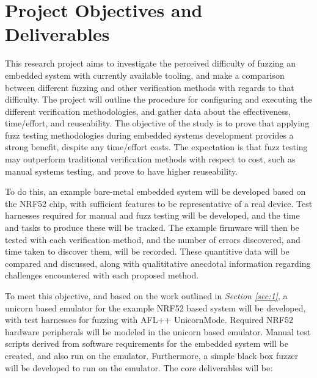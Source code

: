 \documentclass[11pt]{article}
\begin{document}
\section{Project Objectives and Deliverables} \label{sec:2}
This research project aims to investigate the perceived difficulty of fuzzing
an embedded system with currently available tooling, and make a comparison
between different fuzzing and other verification methods with regards to that
difficulty. The project will outline the procedure for configuring and
executing the different verification methodologies, and gather data about the
effectiveness, time/effort, and reuseability. The objective of the study is to
prove that applying fuzz testing methodologies during embedded systems
development provides a strong benefit, despite any time/effort costs. The
expectation is that fuzz testing may outperform traditional verification
methods with respect to cost, such as manual systems testing, and prove to have
higher reuseability.

To do this, an example bare-metal embedded system will be developed based on
the NRF52 chip, with sufficient features to be representative of a real device.
Test harnesses required for manual and fuzz testing will be developed, and the
time and tasks to produce these will be tracked. The example firmware will then
be tested with each verification method, and the number of errors discovered,
and time taken to discover them, will be recorded. These quantitive data will
be compared and discussed, along with qualititative anecdotal information
regarding challenges encountered with each proposed method.


To meet this objective, and based on the work outlined in \textit{Section
\ref{sec:1}}, a unicorn based emulator for the example NRF52 based system will
be developed, with test harnesses for fuzzing with AFL++ UnicornMode. Required
NRF52 hardware peripherals will be modeled in the unicorn based emulator.
Manual test scripts derived from software requirements for the embedded system
will be created, and also run on the emulator. Furthermore, a simple black box
fuzzer will be developed to run on the emulator. The core deliverables will be:
\end{document}
